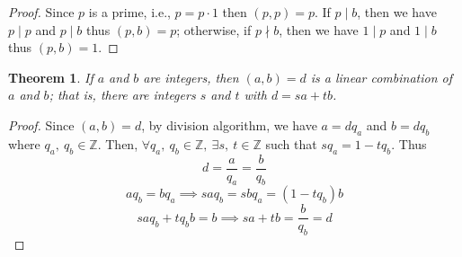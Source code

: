 \documentclass{article}
\newtheorem{theorem}{Theorem}[section]
\begin{document}
    \begin{proof}
        Since \(p\) is a prime, i.e., \(p=p \cdot 1 \) then \((p, p) = p\). If \(p \mid b\), 
        then we have \(p \mid p\) and \(p \mid b\) thus \((p, b)=p\); otherwise, if \(p \nmid b\), 
        then we have \(1 \mid p\) and \(1 \mid b\) thus \((p, b)=1\).
    \end{proof}
    \begin{theorem}
        If \(a\) and \(b\) are integers, then \((a, b)=d\) is a linear combination of \(a\)
        and \(b\); that is, there are integers \(s\) and \(t\) with \(d=sa+tb\).
    \end{theorem}
    \begin{proof}
        Since \((a,b)=d\), by division algorithm, we have \(a=dq_a\) and \(b=dq_b\) where 
        \(q_a,\ q_b \in \mathbb{Z}\). Then, \(\forall q_a,\ q_b \in \mathbb{Z}, \ \exists s,\ t \in \mathbb{Z}\)
        such that \(sq_a=1-tq_b\). Thus 
        \[d=\dfrac{a}{q_a}=\dfrac{b}{q_b}\]
        \[aq_b=bq_a \implies saq_b=sbq_a=(1-tq_b)b\]
        \[saq_b+tq_bb=b \implies sa+tb=\dfrac{b}{q_b}=d\]
    \end{proof}
\end{document}
